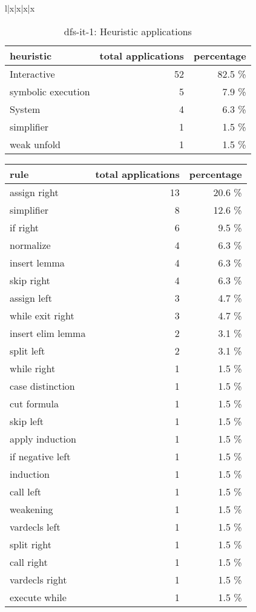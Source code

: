 {\begin{table}[!ht]
\begin{tabular}{l|x|x|x|x}
\end{tabular}

	\caption{dfs-it-1: Statistic for each theorem}
	\label{tab:dfs-it-1-stat}
\end{table}


\begin{table}[!ht]
	\centering

\begin{tabular}{l|r|r}
heuristic	& total applications & percentage \\ \hline
Interactive & 52 & 82.5 \% \\
symbolic execution & 5 & 7.9 \% \\
System & 4 & 6.3 \% \\
simplifier & 1 & 1.5 \% \\
weak unfold & 1 & 1.5 \% \\

\end{tabular}

	\caption{dfs-it-1: Heuristic applications}
	\label{tab:dfs-it-1-heur}
\end{table}


\begin{table}[!ht]
	\centering

\begin{tabular}{l|r|r}
rule	        & total applications & percentage \\ \hline
assign right & 13 & 20.6 \% \\
simplifier & 8 & 12.6 \% \\
if right & 6 & 9.5 \% \\
normalize & 4 & 6.3 \% \\
insert lemma & 4 & 6.3 \% \\
skip right & 4 & 6.3 \% \\
assign left & 3 & 4.7 \% \\
while exit right & 3 & 4.7 \% \\
insert elim lemma & 2 & 3.1 \% \\
split left & 2 & 3.1 \% \\
while right & 1 & 1.5 \% \\
case distinction & 1 & 1.5 \% \\
cut formula & 1 & 1.5 \% \\
skip left & 1 & 1.5 \% \\
apply induction & 1 & 1.5 \% \\
if negative left & 1 & 1.5 \% \\
induction & 1 & 1.5 \% \\
call left & 1 & 1.5 \% \\
weakening & 1 & 1.5 \% \\
vardecls left & 1 & 1.5 \% \\
split right & 1 & 1.5 \% \\
call right & 1 & 1.5 \% \\
vardecls right & 1 & 1.5 \% \\
execute while & 1 & 1.5 \% \\


\end{tabular}
\end{table}}
